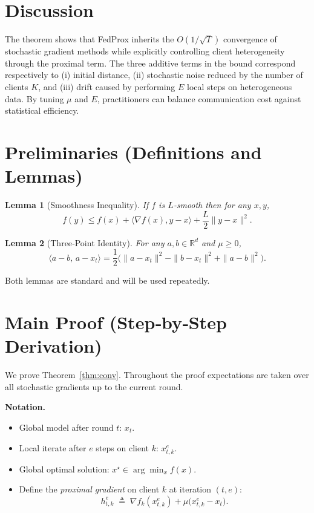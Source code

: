 \documentclass{article}
\newtheorem{lemma}{Lemma}
\newcommand{\R}{\mathbb{R}}
\begin{document}
\section*{Discussion}
The theorem shows that FedProx inherits the $O(1/\sqrt{T})$ convergence of stochastic gradient methods while explicitly controlling client heterogeneity through the proximal term. The three additive terms in the bound correspond respectively to (i) initial distance, (ii) stochastic noise reduced by the number of clients $K$, and (iii) drift caused by performing $E$ local steps on heterogeneous data. By tuning $\mu$ and $E$, practitioners can balance communication cost against statistical efficiency.

\section*{Preliminaries (Definitions and Lemmas)}
\begin{lemma}[Smoothness Inequality]\label{lem:smooth}
If $f$ is $L$‑smooth then for any $x,y$,
\[
    f(y)\le f(x)+\langle\nabla f(x),y-x\rangle+\frac{L}{2}\|y-x\|^2 .
\]
\end{lemma}
\begin{lemma}[Three‑Point Identity]\label{lem:prox}
For any $a,b\in\R^d$ and $\mu\ge0$,
\[
    \langle a-b,\,a-x_t\rangle
    =\frac12\bigl(\|a-x_t\|^2-\|b-x_t\|^2+\|a-b\|^2\bigr).
\]
\end{lemma}
Both lemmas are standard and will be used repeatedly.

\section*{Main Proof (Step‑by‑Step Derivation)}
We prove Theorem~\ref{thm:conv}. Throughout the proof expectations are taken over all stochastic gradients up to the current round.

\noindent\textbf{Notation.}
\begin{itemize}
    \item Global model after round $t$: $x_t$.
    \item Local iterate after $e$ steps on client $k$: $x_{t,k}^{e}$.
    \item Global optimal solution: $x^\star\in\arg\min_x f(x)$.
    \item Define the \emph{proximal gradient} on client $k$ at iteration $(t,e)$:
    \[
        h_{t,k}^{e}\;\triangleq\;\nabla f_k(x_{t,k}^{e})+\mu\bigl(x_{t,k}^{e}-x_t\bigr) .
    \]
\end{itemize}
\end{document}
